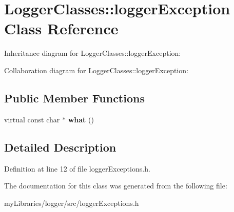 \hypertarget{classLoggerClasses_1_1loggerException}{}\section{Logger\+Classes\+::logger\+Exception Class Reference}
\label{classLoggerClasses_1_1loggerException}


Inheritance diagram for Logger\+Classes\+::logger\+Exception\+:


Collaboration diagram for Logger\+Classes\+::logger\+Exception\+:
\subsection*{Public Member Functions}
\begin{DoxyCompactItemize}
\item 
\mbox{\label{classLoggerClasses_1_1loggerException_a6da0e347c3a19e07c5877056d6c288fc}} 
virtual const char $\ast$ {\bfseries what} ()
\end{DoxyCompactItemize}


\subsection{Detailed Description}


Definition at line 12 of file logger\+Exceptions.\+h.



The documentation for this class was generated from the following file\+:\begin{DoxyCompactItemize}
\item 
my\+Libraries/logger/src/logger\+Exceptions.\+h\end{DoxyCompactItemize}
